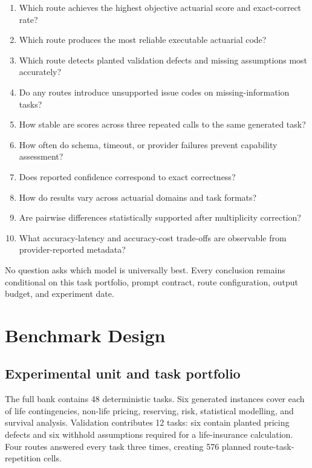 \documentclass[11pt]{article}
\begin{document}
\begin{enumerate}
    \item Which route achieves the highest objective actuarial score and exact-correct rate?
    \item Which route produces the most reliable executable actuarial code?
    \item Which route detects planted validation defects and missing assumptions most accurately?
    \item Do any routes introduce unsupported issue codes on missing-information tasks?
    \item How stable are scores across three repeated calls to the same generated task?
    \item How often do schema, timeout, or provider failures prevent capability assessment?
    \item Does reported confidence correspond to exact correctness?
    \item How do results vary across actuarial domains and task formats?
    \item Are pairwise differences statistically supported after multiplicity correction?
    \item What accuracy-latency and accuracy-cost trade-offs are observable from provider-reported metadata?
\end{enumerate}

No question asks which model is universally best. Every conclusion remains conditional on this task portfolio, prompt contract, route configuration, output budget, and experiment date.

\section{Benchmark Design}

\subsection{Experimental unit and task portfolio}

The full bank contains 48 deterministic tasks. Six generated instances cover each of life contingencies, non-life pricing, reserving, risk, statistical modelling, and survival analysis. Validation contributes 12 tasks: six contain planted pricing defects and six withhold assumptions required for a life-insurance calculation. Four routes answered every task three times, creating 576 planned route-task-repetition cells.

\begin{table}[H]
\centering
\caption{Recorded experiment provenance. Values are read from the frozen manifest.}
\small

\end{table}
\end{document}
